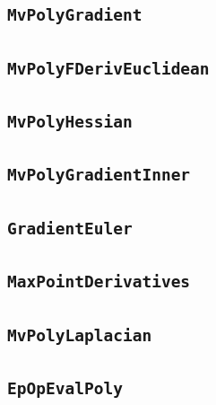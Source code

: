 \documentclass[11pt]{amsart}
\theoremstyle{definition}
\begin{document}
\subsection{\texorpdfstring{\texttt{MvPolyGradient}}{MvPolyGradient}}\label{node:MvPolyGradient}


\subsection{\texorpdfstring{\texttt{MvPolyFDerivEuclidean}}{MvPolyFDerivEuclidean}}\label{node:MvPolyFDerivEuclidean}


\subsection{\texorpdfstring{\texttt{MvPolyHessian}}{MvPolyHessian}}\label{node:MvPolyHessian}


\subsection{\texorpdfstring{\texttt{MvPolyGradientInner}}{MvPolyGradientInner}}\label{node:MvPolyGradientInner}


\subsection{\texorpdfstring{\texttt{GradientEuler}}{GradientEuler}}\label{node:GradientEuler}


\subsection{\texorpdfstring{\texttt{MaxPointDerivatives}}{MaxPointDerivatives}}\label{node:MaxPointDerivatives}


\subsection{\texorpdfstring{\texttt{MvPolyLaplacian}}{MvPolyLaplacian}}\label{node:MvPolyLaplacian}


\subsection{\texorpdfstring{\texttt{EpOpEvalPoly}}{EpOpEvalPoly}}\label{node:EpOpEvalPoly}

\end{document}

